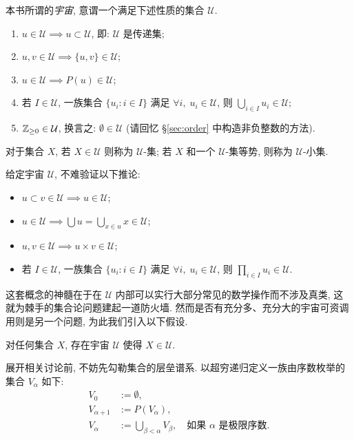 \begin{definition}
	本书所谓的\emph{宇宙}, 意谓一个满足下述性质的集合 $\mathcal{U}$.
	\begin{enumerate}[\bfseries {U}.1]
		\item $u \in \mathcal{U} \implies u \subset \mathcal{U}$, 即: $\mathcal{U}$ 是传递集;
		\item $u,v \in \mathcal{U} \implies \{u, v\} \in \mathcal{U}$;
		\item $u \in \mathcal{U} \implies P(u) \in \mathcal{U}$;
		\item 若 $I \in \mathcal{U}$, 一族集合 $\{u_i : i \in I\}$ 满足 $\forall i, \; u_i \in \mathcal{U}$, 则 $\bigcup_{i \in I} u_i \in \mathcal{U}$;
		\item $\mathbb{Z}_{\geq 0} \in \mathcal{U}$, 换言之: $\emptyset \in \mathcal{U}$ (请回忆 \S\ref{sec:order} 中构造非负整数的方法).
	\end{enumerate}
	对于集合 $X$, 若 $X \in \mathcal{U}$ 则称为 $\mathcal{U}$-集; 若 $X$ 和一个 $\mathcal{U}$-集等势, 则称为 $\mathcal{U}$-小集.
\end{definition}

给定宇宙 $\mathcal{U}$, 不难验证以下推论:
\begin{itemize}
	\item $u \subset v \in \mathcal{U} \implies u \in \mathcal{U}$;
	\item $u \in \mathcal{U} \implies \bigcup u = \bigcup_{x \in u} x  \in \mathcal{U}$;
	\item $u, v \in \mathcal{U} \implies u \times v \in \mathcal{U}$;
	\item 若 $I \in \mathcal{U}$, 一族集合 $\{u_i : i \in I\}$ 满足 $\forall i, \; u_i \in \mathcal{U}$, 则 $\prod_{i \in I} u_i \in \mathcal{U}$.
\end{itemize}

这套概念的神髓在于在 $\mathcal{U}$ 内部可以实行大部分常见的数学操作而不涉及真类, 这就为棘手的集合论问题建起一道防火墙. 然而是否有充分多、充分大的宇宙可资调用则是另一个问题, 为此我们引入以下假设.

\begin{hypothesis}[A.\ Grothendieck]\label{hyp:universe}
	对任何集合 $X$, 存在宇宙 $\mathcal{U}$ 使得 $X \in \mathcal{U}$.
\end{hypothesis}

展开相关讨论前, 不妨先勾勒集合的层垒谱系. 以超穷递归定义一族由序数枚举的集合 $V_\alpha$ 如下: 
\begin{align*}
	V_0 & := \emptyset, \\
	V_{\alpha+1} & := P(V_\alpha), \\
	V_\alpha & :=\bigcup_{\beta < \alpha} V_\beta, \quad \text{如果 $\alpha$ 是极限序数}.
\end{align*}

